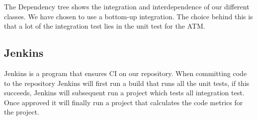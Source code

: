 	\pagebreak
	The Dependency tree shows the integration and interdependence of our different classes. We have chosen to use a bottom-up integration. The choice behind this is that a lot of the integration test lies in the unit test for the ATM. 
	
	\subsection{Jenkins}
	Jenkins is a program that ensures CI on our repository. When committing code to the repository  Jenkins will first run a build that runs all the unit tests, if this succeeds, Jenkins will subsequent run a project which tests all integration test. Once approved it will finally run a project that calculates the code metrics for the project.
	